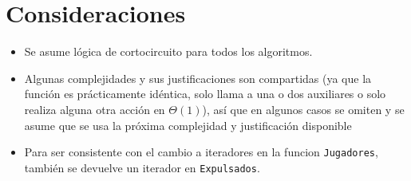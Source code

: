 \section{Consideraciones}

\begin{itemize}
	\item Se asume lógica de cortocircuito para todos los algoritmos.

	\item Algunas complejidades y sus justificaciones son compartidas (ya que la función es prácticamente idéntica, solo llama a una o dos auxiliares o solo realiza alguna otra acción en $\Theta(1)$), así que en algunos casos se omiten y se asume que se usa la próxima complejidad y justificación disponible

	\item Para ser consistente con el cambio a iteradores en la funcion \texttt{Jugadores}, también se devuelve un iterador en \texttt{Expulsados}.
\end{itemize}
